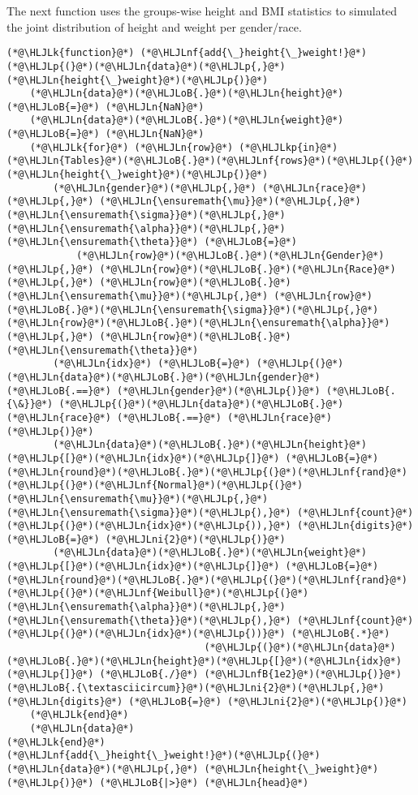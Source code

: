 \documentclass[12pt,a4paper]{article}
\newcommand{\HLJLk}[1]{\textcolor[RGB]{148,91,176}{\textbf{#1}}}
\newcommand{\HLJLkp}[1]{\textcolor[RGB]{148,91,176}{\textbf{#1}}}
\newcommand{\HLJLn}[1]{#1}
\newcommand{\HLJLnf}[1]{\textcolor[RGB]{66,102,213}{#1}}
\newcommand{\HLJLnfB}[1]{\textcolor[RGB]{59,151,46}{#1}}
\newcommand{\HLJLni}[1]{\textcolor[RGB]{59,151,46}{#1}}
\newcommand{\HLJLoB}[1]{\textcolor[RGB]{102,102,102}{\textbf{#1}}}
\newcommand{\HLJLp}[1]{#1}
\begin{document}
The next function uses the groups-wise height and BMI statistics to simulated the joint distribution of height and weight per gender/race.


\begin{lstlisting}
(*@\HLJLk{function}@*) (*@\HLJLnf{add{\_}height{\_}weight!}@*)(*@\HLJLp{(}@*)(*@\HLJLn{data}@*)(*@\HLJLp{,}@*) (*@\HLJLn{height{\_}weight}@*)(*@\HLJLp{)}@*)
    (*@\HLJLn{data}@*)(*@\HLJLoB{.}@*)(*@\HLJLn{height}@*) (*@\HLJLoB{=}@*) (*@\HLJLn{NaN}@*)
    (*@\HLJLn{data}@*)(*@\HLJLoB{.}@*)(*@\HLJLn{weight}@*) (*@\HLJLoB{=}@*) (*@\HLJLn{NaN}@*)
    (*@\HLJLk{for}@*) (*@\HLJLn{row}@*) (*@\HLJLkp{in}@*) (*@\HLJLn{Tables}@*)(*@\HLJLoB{.}@*)(*@\HLJLnf{rows}@*)(*@\HLJLp{(}@*)(*@\HLJLn{height{\_}weight}@*)(*@\HLJLp{)}@*)
        (*@\HLJLn{gender}@*)(*@\HLJLp{,}@*) (*@\HLJLn{race}@*)(*@\HLJLp{,}@*) (*@\HLJLn{\ensuremath{\mu}}@*)(*@\HLJLp{,}@*) (*@\HLJLn{\ensuremath{\sigma}}@*)(*@\HLJLp{,}@*) (*@\HLJLn{\ensuremath{\alpha}}@*)(*@\HLJLp{,}@*) (*@\HLJLn{\ensuremath{\theta}}@*) (*@\HLJLoB{=}@*)
            (*@\HLJLn{row}@*)(*@\HLJLoB{.}@*)(*@\HLJLn{Gender}@*)(*@\HLJLp{,}@*) (*@\HLJLn{row}@*)(*@\HLJLoB{.}@*)(*@\HLJLn{Race}@*)(*@\HLJLp{,}@*) (*@\HLJLn{row}@*)(*@\HLJLoB{.}@*)(*@\HLJLn{\ensuremath{\mu}}@*)(*@\HLJLp{,}@*) (*@\HLJLn{row}@*)(*@\HLJLoB{.}@*)(*@\HLJLn{\ensuremath{\sigma}}@*)(*@\HLJLp{,}@*) (*@\HLJLn{row}@*)(*@\HLJLoB{.}@*)(*@\HLJLn{\ensuremath{\alpha}}@*)(*@\HLJLp{,}@*) (*@\HLJLn{row}@*)(*@\HLJLoB{.}@*)(*@\HLJLn{\ensuremath{\theta}}@*)
        (*@\HLJLn{idx}@*) (*@\HLJLoB{=}@*) (*@\HLJLp{(}@*)(*@\HLJLn{data}@*)(*@\HLJLoB{.}@*)(*@\HLJLn{gender}@*) (*@\HLJLoB{.==}@*) (*@\HLJLn{gender}@*)(*@\HLJLp{)}@*) (*@\HLJLoB{.{\&}}@*) (*@\HLJLp{(}@*)(*@\HLJLn{data}@*)(*@\HLJLoB{.}@*)(*@\HLJLn{race}@*) (*@\HLJLoB{.==}@*) (*@\HLJLn{race}@*)(*@\HLJLp{)}@*)
        (*@\HLJLn{data}@*)(*@\HLJLoB{.}@*)(*@\HLJLn{height}@*)(*@\HLJLp{[}@*)(*@\HLJLn{idx}@*)(*@\HLJLp{]}@*) (*@\HLJLoB{=}@*) (*@\HLJLn{round}@*)(*@\HLJLoB{.}@*)(*@\HLJLp{(}@*)(*@\HLJLnf{rand}@*)(*@\HLJLp{(}@*)(*@\HLJLnf{Normal}@*)(*@\HLJLp{(}@*)(*@\HLJLn{\ensuremath{\mu}}@*)(*@\HLJLp{,}@*) (*@\HLJLn{\ensuremath{\sigma}}@*)(*@\HLJLp{),}@*) (*@\HLJLnf{count}@*)(*@\HLJLp{(}@*)(*@\HLJLn{idx}@*)(*@\HLJLp{)),}@*) (*@\HLJLn{digits}@*) (*@\HLJLoB{=}@*) (*@\HLJLni{2}@*)(*@\HLJLp{)}@*)
        (*@\HLJLn{data}@*)(*@\HLJLoB{.}@*)(*@\HLJLn{weight}@*)(*@\HLJLp{[}@*)(*@\HLJLn{idx}@*)(*@\HLJLp{]}@*) (*@\HLJLoB{=}@*) (*@\HLJLn{round}@*)(*@\HLJLoB{.}@*)(*@\HLJLp{(}@*)(*@\HLJLnf{rand}@*)(*@\HLJLp{(}@*)(*@\HLJLnf{Weibull}@*)(*@\HLJLp{(}@*)(*@\HLJLn{\ensuremath{\alpha}}@*)(*@\HLJLp{,}@*) (*@\HLJLn{\ensuremath{\theta}}@*)(*@\HLJLp{),}@*) (*@\HLJLnf{count}@*)(*@\HLJLp{(}@*)(*@\HLJLn{idx}@*)(*@\HLJLp{))}@*) (*@\HLJLoB{.*}@*)
                                  (*@\HLJLp{(}@*)(*@\HLJLn{data}@*)(*@\HLJLoB{.}@*)(*@\HLJLn{height}@*)(*@\HLJLp{[}@*)(*@\HLJLn{idx}@*)(*@\HLJLp{]}@*) (*@\HLJLoB{./}@*) (*@\HLJLnfB{1e2}@*)(*@\HLJLp{)}@*)(*@\HLJLoB{.{\textasciicircum}}@*)(*@\HLJLni{2}@*)(*@\HLJLp{,}@*) (*@\HLJLn{digits}@*) (*@\HLJLoB{=}@*) (*@\HLJLni{2}@*)(*@\HLJLp{)}@*)
    (*@\HLJLk{end}@*)
    (*@\HLJLn{data}@*)
(*@\HLJLk{end}@*)
(*@\HLJLnf{add{\_}height{\_}weight!}@*)(*@\HLJLp{(}@*)(*@\HLJLn{data}@*)(*@\HLJLp{,}@*) (*@\HLJLn{height{\_}weight}@*)(*@\HLJLp{)}@*) (*@\HLJLoB{|>}@*) (*@\HLJLn{head}@*)
\end{lstlisting}
\end{document}

